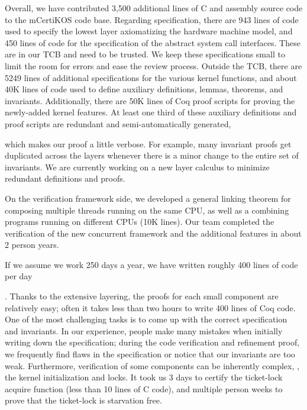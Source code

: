 Overall, we have contributed 3,500 additional lines of C and assembly
source code to the mCertiKOS code base. Regarding specification, there
are 943 lines of code used to specify the lowest layer axiomatizing
the hardware machine model, and 450 lines of code for the
specification of the abstract system call interfaces. These are in our
TCB and need to be trusted. We keep these specifications small to
limit the room for errors and ease the review process.  Outside the
TCB, there are 5249 lines of additional specifications for the various
kernel functions, and about 40K lines of code used to define auxiliary
definitions, lemmas, theorems, and invariants. Additionally, there are
50K lines of Coq proof scripts for proving the newly-added kernel
features. At least one third of these auxiliary definitions and proof
scripts are redundant and semi-automatically generated, which makes our proof a little verbose.  For
example, many invariant proofs get duplicated across the layers
whenever there is a minor change to the entire set of invariants.  We
are currently working on a new layer calculus to minimize redundant
definitions and proofs.

On the verification framework side, we developed a general linking
theorem for composing multiple threads running on the same CPU, as
well as a combining programs running on
different CPUs (10K lines).
Our team completed the verification of the new concurrent framework
and the additional features in about 2 person years. 
 If we assume we work 250
days a year, we have written roughly 400 lines of code per
day.  Thanks to the extensive layering,
the proofs for each small component are relatively easy; often it
takes less than two hours to write 400 lines of Coq code.  One of the
most challenging tasks is to come up with the correct specification
and invariants. In our experience, people make many mistakes when
initially writing down the specification; during the code verification
and refinement proof, we frequently find flaws in the specification or
notice that our invariants are too weak.  Furthermore, verification of
some components can be inherently complex, \eg, the kernel
initialization and locks.  It took us 3 days to certify the
ticket-lock acquire function (less than 10 lines of C code), and
multiple person weeks to prove that the ticket-lock is
starvation free.


